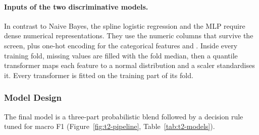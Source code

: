 \documentclass[../main.tex]{subfiles}
\begin{document}
\paragraph{Inputs of the two discriminative models.} In contrast to Naive Bayes, the spline logistic regression and the MLP require dense numerical representations. They use the numeric columns that survive the screen, plus one-hot encoding for the categorical features  and . Inside every training fold, missing values are filled with the fold median, then a quantile transformer maps each feature to a normal distribution and a scaler standardises it. Every transformer is fitted on the training part of its fold.

\subsubsection{Model Design}
\label{sec:t2-design}

The final model is a three-part probabilistic blend followed by a decision rule tuned for macro F1 (Figure~\ref{fig:t2-pipeline}, Table~\ref{tab:t2-models}).
\end{document}
